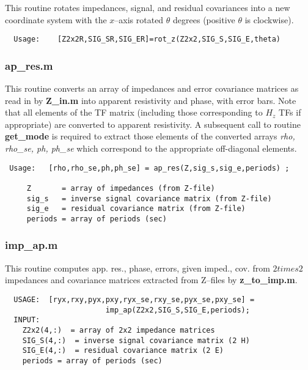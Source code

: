 This routine rotates impedances, signal, and residual covariances
into a new coordinate system with the $x$--axis rotated $\theta$
degrees  (positive $\theta$ is clockwise).

\small
\begin{verbatim}
  Usage:    [Z2x2R,SIG_SR,SIG_ER]=rot_z(Z2x2,SIG_S,SIG_E,theta)
\end{verbatim}
\normalsize

\subsubsection{ap\_res.m}

This routine converts an array of impedances and error covariance
matrices as read in by {\bf Z\_in.m} into apparent resistivity and
phase, with error bars.  Note that all elements of the TF matrix
(including those corresponding to $H_z$ TFs if appropriate)
are converted to apparent resistivity.  A subsequent call to
routine {\bf get\_mode} is required to extract those elements
of the converted arrays {\it rho, rho\_se, ph, ph\_se} which
correspond to the appropriate off-diagonal elements.

\small
\begin{verbatim}
 Usage:   [rho,rho_se,ph,ph_se] = ap_res(Z,sig_s,sig_e,periods) ;

     Z       = array of impedances (from Z-file)
     sig_s   = inverse signal covariance matrix (from Z-file)
     sig_e   = residual covariance matrix (from Z-file)
     periods = array of periods (sec)
\end{verbatim}
\normalsize

\subsubsection{imp\_ap.m}

This routine
computes app. res., phase, errors, given imped., cov.
from $2 times 2$ impedances and covariance matrices extracted from
Z--files by {\bf z\_to\_imp.m}.

\small
\begin{verbatim}
  USAGE:  [ryx,rxy,pyx,pxy,ryx_se,rxy_se,pyx_se,pxy_se] =
                       imp_ap(Z2x2,SIG_S,SIG_E,periods);
  INPUT:
    Z2x2(4,:)  = array of 2x2 impedance matrices
    SIG_S(4,:)  = inverse signal covariance matrix (2 H)
    SIG_E(4,:)  = residual covariance matrix (2 E)
    periods = array of periods (sec)
\end{verbatim}
\normalsize

